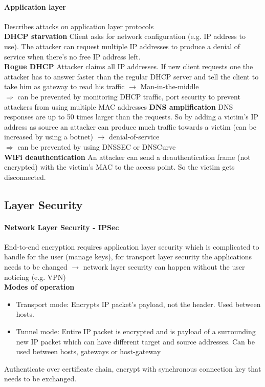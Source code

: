 \documentclass[12pt]{article}
\begin{document}
	\paragraph{Application layer} Describes attacks on application layer protocols\\
	\textbf{DHCP starvation} Client asks for network configuration (e.g. IP address to use). The attacker can request multiple IP addresses to produce a denial of service when there's no free IP address left.\\
	\textbf{Rogue DHCP} Attacker claims all IP addresses. If new client requests one the attacker has to answer faster than the regular DHCP server and tell the client to take him as gateway to read his traffic $\rightarrow$ Man-in-the-middle\\
	$\Rightarrow$ can be prevented by monitoring DHCP traffic, port security to prevent attackers from using multiple MAC addresses
	\textbf{DNS amplification} DNS responses are up to 50 times larger than the requests. So by adding a victim's IP address as source an attacker can produce much traffic towards a victim (can be increased by using a botnet) $\rightarrow$ denial-of-service\\
	$\Rightarrow$ can be prevented by using DNSSEC or DNSCurve\\
	\textbf{WiFi deauthentication} An attacker can send a deauthentication frame (not encrypted) with the victim's MAC to the access point. So the victim gets disconnected.
	
	\subsection{Layer Security}
	\paragraph{Network Layer Security - IPSec} End-to-end encryption requires application layer security which is complicated to handle for the user (manage keys), for transport layer security the applications needs to be changed $\rightarrow$ network layer security can happen without the user noticing (e.g. VPN)\\
	\textbf{Modes of operation}
	\begin{itemize}
		\item Transport mode: Encrypts IP packet's payload, not the header. Used between hosts.
		\item Tunnel mode: Entire IP packet is encrypted and is payload of a surrounding new IP packet which can have different target and source addresses. Can be used between hosts, gateways or host-gateway
	\end{itemize}
	Authenticate over certificate chain, encrypt with synchronous connection key that needs to be exchanged.
\end{document}
